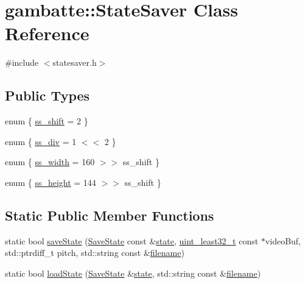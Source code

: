 \hypertarget{classgambatte_1_1StateSaver}{}\section{gambatte\+:\+:State\+Saver Class Reference}
\label{classgambatte_1_1StateSaver}


{\ttfamily \#include $<$statesaver.\+h$>$}

\subsection*{Public Types}
\begin{DoxyCompactItemize}
\item 
enum \{ \hyperlink{classgambatte_1_1StateSaver_ae198109f1afd0eeae59a056efb659a62a796008c573f248ed2df587a64bd2c56a}{ss\+\_\+shift} = 2
 \}
\item 
enum \{ \hyperlink{classgambatte_1_1StateSaver_a7a727a444a7f39b775b6fa00a4d8b7b7a57157847503e09dbb1b5c83a7fe98ace}{ss\+\_\+div} = 1 $<$$<$ 2
 \}
\item 
enum \{ \hyperlink{classgambatte_1_1StateSaver_a37f3c4400dc9ae31ee260a16dc580a63ac4459ac125ae22c280a7bb1b45b0878a}{ss\+\_\+width} = 160 $>$$>$ ss\+\_\+shift
 \}
\item 
enum \{ \hyperlink{classgambatte_1_1StateSaver_a46feccb5e5ac95e30777dd3442559095a850759c51b83eb9eeb127cd21d3ca232}{ss\+\_\+height} = 144 $>$$>$ ss\+\_\+shift
 \}
\end{DoxyCompactItemize}
\subsection*{Static Public Member Functions}
\begin{DoxyCompactItemize}
\item 
static bool \hyperlink{classgambatte_1_1StateSaver_abbc44cde3c1406a300656c57574453e8}{save\+State} (\hyperlink{structgambatte_1_1SaveState}{Save\+State} const \&\hyperlink{ppu_8cpp_a2f2eca6997ee7baf8901725ae074d45b}{state}, \hyperlink{namespacegambatte_a0639f09fccfbbd5a8e0796318768e370}{uint\+\_\+least32\+\_\+t} const $\ast$video\+Buf, std\+::ptrdiff\+\_\+t pitch, std\+::string const \&\hyperlink{ioapi_8h_a7a03a664b090ce5c848ecb31cb4a2fa8}{filename})
\item 
static bool \hyperlink{classgambatte_1_1StateSaver_a0abf1c65ad9d738043fcc8ef819d4bef}{load\+State} (\hyperlink{structgambatte_1_1SaveState}{Save\+State} \&\hyperlink{ppu_8cpp_a2f2eca6997ee7baf8901725ae074d45b}{state}, std\+::string const \&\hyperlink{ioapi_8h_a7a03a664b090ce5c848ecb31cb4a2fa8}{filename})
\end{DoxyCompactItemize}
